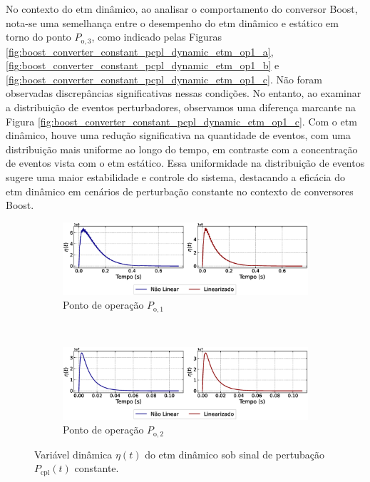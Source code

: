 No contexto do \acrshort{etm} dinâmico, ao analisar o comportamento do conversor Boost, nota-se uma semelhança entre o desempenho do \acrshort{etm} dinâmico e estático em torno do ponto $P_{\mathrm{o}, 3}$, como indicado pelas Figuras \ref{fig:boost_converter_constant_pcpl_dynamic_etm_op1_a}, \ref{fig:boost_converter_constant_pcpl_dynamic_etm_op1_b} e \ref{fig:boost_converter_constant_pcpl_dynamic_etm_op1_c}. Não foram observadas discrepâncias significativas nessas condições. No entanto, ao examinar a distribuição de eventos perturbadores, observamos uma diferença marcante na Figura \ref{fig:boost_converter_constant_pcpl_dynamic_etm_op1_c}. Com o \acrshort{etm} dinâmico, houve uma redução significativa na quantidade de eventos, com uma distribuição mais uniforme ao longo do tempo, em contraste com a concentração de eventos vista com o \acrshort{etm} estático. Essa uniformidade na distribuição de eventos sugere uma maior estabilidade e controle do sistema, destacando a eficácia do \acrshort{etm} dinâmico em cenários de perturbação constante no contexto de conversores Boost.

\begin{figure}[H]
  \centering
  \captionsetup{justification=centering}
  \begin{subfigure}{1.\textwidth}
    \centering
    \includegraphics[width=1.\textwidth]{figuras/dynamic-etm/boost/sim1/op1/eta.eps}
    \caption{Ponto de operação $P_{\mathrm{o}, 1}$}
  \end{subfigure}
  \\[6pt]
  \begin{subfigure}{1.\textwidth}
    \centering
    \includegraphics[width=1.\textwidth]{figuras/dynamic-etm/boost/sim1/op2/eta.eps}
    \caption{Ponto de operação $P_{\mathrm{o}, 2}$}
  \end{subfigure}
  \caption{Variável dinâmica $\eta(t)$ do \acrshort{etm} dinâmico sob sinal de pertubação $P_{\mathrm{cpl}}(t)$ constante.}
  \label{fig:boost_converter_constant_pcpl_dynamic_etm_eta}
\end{figure}

